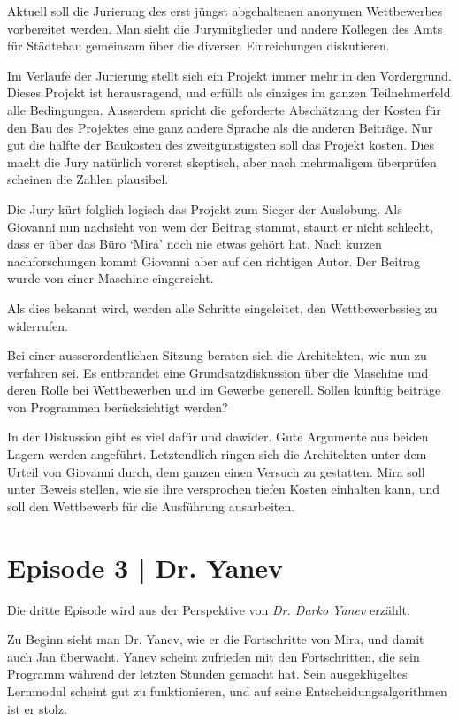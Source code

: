 \documentclass[11pt,a4paper,ngerman]{scrreprt}
\begin{document}
Aktuell soll die Jurierung des erst jüngst abgehaltenen anonymen Wettbewerbes
vorbereitet werden. Man sieht die Jurymitglieder und andere Kollegen des Amts
für Städtebau gemeinsam über die diversen Einreichungen diskutieren.

Im Verlaufe der Jurierung stellt sich ein Projekt immer mehr in den
Vordergrund. Dieses Projekt ist herausragend, und erfüllt als einziges im ganzen
Teilnehmerfeld alle Bedingungen. Ausserdem spricht die geforderte Abschätzung
der Kosten für den Bau des Projektes eine ganz andere Sprache als die anderen
Beiträge. Nur gut die hälfte der Baukosten des zweitgünstigsten soll das Projekt
kosten. Dies macht die Jury natürlich vorerst skeptisch, aber nach mehrmaligem
überprüfen scheinen die Zahlen plausibel.

Die Jury kürt folglich logisch das Projekt zum Sieger der Auslobung. Als
Giovanni nun nachsieht von wem der Beitrag stammt, staunt er nicht schlecht,
dass er über das Büro `Mira' noch nie etwas gehört hat. Nach kurzen
nachforschungen kommt Giovanni aber auf den richtigen Autor. Der Beitrag wurde
von einer Maschine eingereicht.

Als dies bekannt wird, werden alle Schritte eingeleitet, den Wettbewerbssieg zu
widerrufen.

Bei einer ausserordentlichen Sitzung beraten sich die Architekten, wie nun zu
verfahren sei. Es entbrandet eine Grundsatzdiskussion über die Maschine und
deren Rolle bei Wettbewerben und im Gewerbe generell. Sollen künftig beiträge
von Programmen berücksichtigt werden?

In der Diskussion gibt es viel dafür und dawider. Gute Argumente aus beiden
Lagern werden angeführt. Letztendlich ringen sich die Architekten unter dem
Urteil von Giovanni durch, dem ganzen einen Versuch zu gestatten. Mira soll
unter Beweis stellen, wie sie ihre versprochen tiefen Kosten einhalten kann, und
soll den Wettbewerb für die Ausführung ausarbeiten.

\section*{Episode 3 | Dr. Yanev}

Die dritte Episode wird aus der Perspektive von \emph{Dr. Darko Yanev} erzählt.

Zu Beginn sieht man Dr. Yanev, wie er die Fortschritte von Mira, und damit auch
Jan überwacht. Yanev scheint zufrieden mit den Fortschritten, die sein Programm
während der letzten Stunden gemacht hat. Sein ausgeklügeltes Lernmodul scheint
gut zu funktionieren, und auf seine Entscheidungsalgorithmen ist er stolz.
\end{document}
